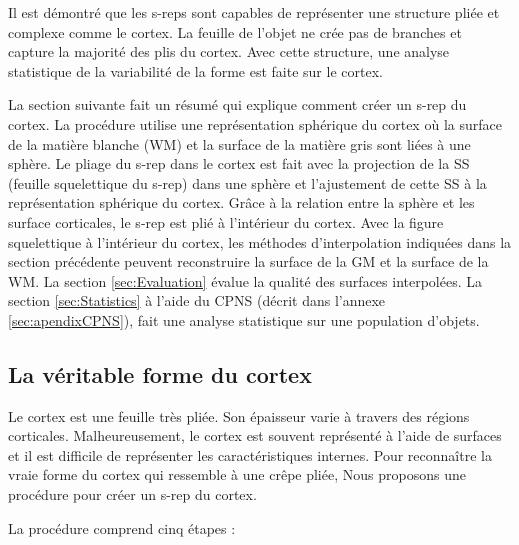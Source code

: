 Il est démontré que les s-reps sont capables de représenter une structure pliée et complexe comme le cortex.
La feuille de l'objet ne crée pas de branches et capture la majorité des plis du cortex.
Avec cette structure, une analyse statistique de la variabilité de la forme est faite sur le cortex.

La section suivante fait un résumé qui explique comment créer un s-rep du cortex.
La procédure utilise une représentation sphérique du cortex \cite{fischl_cortical_1999} où la surface de la matière blanche (WM) et la surface de la matière gris sont liées à une sphère.
Le pliage du s-rep dans le cortex est fait avec la projection de la SS (feuille squelettique du s-rep) dans une sphère et l'ajustement de cette SS à la représentation sphérique du cortex.
Grâce à la relation entre la sphère et les surface corticales, le s-rep est plié à l'intérieur du cortex.
Avec la figure squelettique à l'intérieur du cortex, les méthodes d'interpolation indiquées dans la section précédente peuvent reconstruire la surface de la GM et la surface de la WM.
La section \ref{sec:Evaluation} évalue la qualité des surfaces interpolées.
La section \ref{sec:Statistics} à l'aide du CPNS (décrit dans l'annexe \ref{sec:apendixCPNS}),
fait une analyse statistique sur une population d'objets. 

\subsection{La véritable forme du cortex}

Le cortex est une feuille très pliée. Son épaisseur varie à travers des régions corticales.
Malheureusement, le cortex est souvent représenté à l'aide de surfaces et il est difficile 
de représenter les caractéristiques internes.
Pour reconnaître la vraie forme du cortex qui ressemble à une crêpe pliée,
Nous proposons une procédure pour créer un s-rep du cortex.

La procédure comprend cinq étapes :

